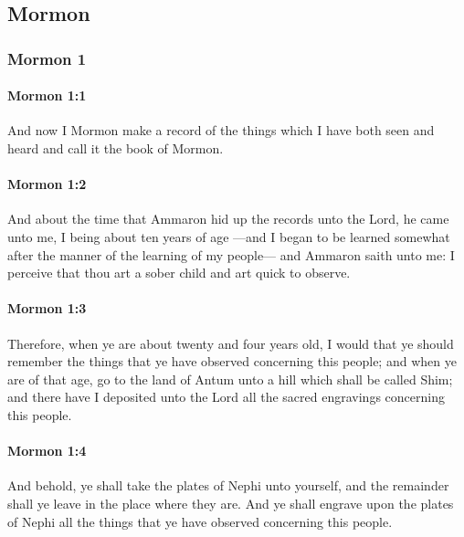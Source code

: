 \subsection{Mormon}
	\label{MORMON}
	
	\subsubsection{Mormon 1} %
		\label{MORMON-1}
		
		\paragraph{Mormon 1:1} %
			\label{MORMON-1-1}

			And now I Mormon make a record of the things
			which I have both seen and heard
			and call it the book of Mormon.

		\paragraph{Mormon 1:2} %
			\label{MORMON-1-2}

			And about the time that Ammaron hid up the records unto the Lord,
			he came unto me, I being about ten years of age
			---and I began to be learned somewhat
			after the manner of the learning of my people---
			and Ammaron saith unto me:
			I perceive that thou art a sober child and art quick to observe.

		\paragraph{Mormon 1:3} %
			\label{MORMON-1-3}

			Therefore, when ye are about twenty and four years old,
			I would that ye should remember the things
			that ye have observed concerning this people;
			and when ye are of that age,
			go to the land of Antum unto a hill which shall be called Shim;
			and there have I deposited unto the Lord
			all the sacred engravings concerning this people.

		\paragraph{Mormon 1:4} %
			\label{MORMON-1-4}

			And behold, ye shall take the plates of Nephi unto yourself,
			and the remainder shall ye leave in the place where they are.
			And ye shall engrave upon the plates of Nephi all the things
			that ye have observed concerning this people.

